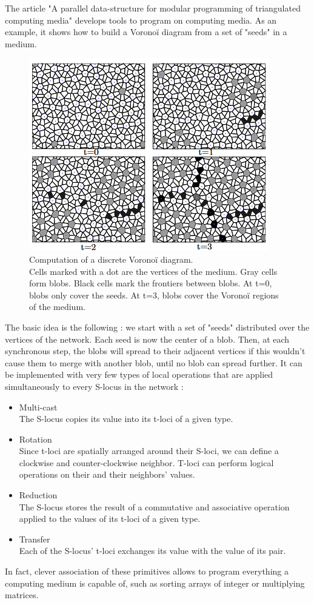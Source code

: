 \documentclass{article}
\begin{document}
The article "A parallel data-structure for modular programming of triangulated computing media"\cite{Voronoi} develops tools to program on computing media. As an example, it shows how to build a Voronoï diagram from a set of "seeds" in a medium.

\begin{figure}[H]
	\centering\includegraphics[width=0.7\linewidth]{assets/voronoi_spread.png}
	\caption{
		Computation of a discrete Voronoï diagram.\\
		Cells marked with a dot are the vertices of the medium.
		Gray cells form blobs. Black cells mark the frontiers between blobs. At t=0, blobs only cover the seeds. At t=3, blobs cover the Voronoï regions of the medium.
	}
	\label{fig:voronoi_spread}
\end{figure}

The basic idea is the following : we start with a set of "seeds" distributed over the vertices of the network. Each seed is now the center of a blob. Then, at each synchronous step, the blobs will spread to their adjacent vertices if this wouldn't cause them to merge with another blob, until no blob can spread further. It can be implemented with very few types of local operations that are applied simultaneously to every S-locus in the network :
\begin{itemize}
	\item Multi-cast\\
	The S-locus copies its value into its t-loci of a given type.
	\item Rotation\\
	Since t-loci are spatially arranged around their S-loci, we can define a clockwise and counter-clockwise neighbor. T-loci can perform logical operations on their and their neighbors' values.
	\item Reduction\\
	The S-locus stores the result of a commutative and associative operation applied to the values of its t-loci of a given type.
	\item Transfer\\
	Each of the S-locus' t-loci exchanges its value with the value of its pair. 
\end{itemize}
In fact, clever association of these primitives allows to program everything a computing medium is capable of, such as sorting arrays of integer or multiplying matrices\cite{other_computation}.
\end{document}
